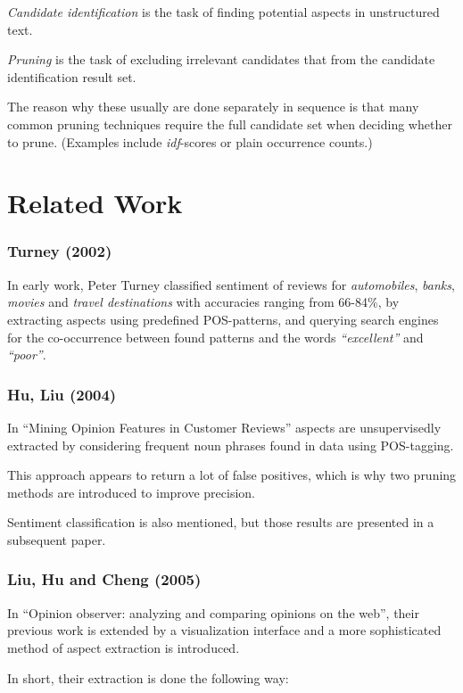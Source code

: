 \documentclass[a4paper,11pt]{kth-mag}
\begin{document}
\emph{Candidate identification} is the task of finding potential aspects in unstructured text.

\emph{Pruning} is the task of excluding irrelevant candidates that from the candidate
identification result set.

The reason why these usually are done separately in sequence is that many common pruning
techniques require the full candidate set when deciding whether to prune.
(Examples include \emph{idf}-scores or plain occurrence counts.)


\section{Related Work}

\subsubsection{Turney (2002)}
In early work, Peter Turney classified sentiment of reviews for \emph{automobiles}, \emph{banks}, \emph{movies} and \emph{travel destinations} with accuracies ranging from 66-84\%, by extracting aspects using predefined POS-patterns, and querying search engines for the co-occurrence between found patterns and the words \emph{``excellent''} and \emph{``poor''}.

\subsubsection{Hu, Liu (2004)}
In ``Mining Opinion Features in Customer Reviews'' aspects are unsupervisedly
extracted by considering frequent noun phrases found in data using POS-tagging.

This approach appears to return a lot of false positives, which is why two pruning
methods are introduced to improve precision.

Sentiment classification is also mentioned, but those results are presented in a subsequent paper.

\subsubsection{Liu, Hu and Cheng (2005)}
In ``Opinion observer: analyzing and comparing opinions on the web'', their previous work is extended
by a visualization interface and a more sophisticated method of aspect extraction is introduced.

In short, their extraction is done the following way:
\end{document}
